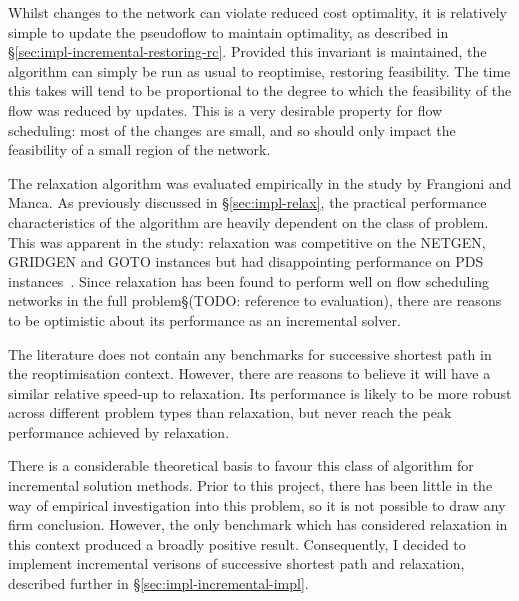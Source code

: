Whilst changes to the network can violate reduced cost optimality, it is relatively simple to update the pseudoflow to maintain optimality, as described in \S\ref{sec:impl-incremental-restoring-rc}. Provided this invariant is maintained, the algorithm can simply be run as usual to reoptimise, restoring feasibility. The time this takes will tend to be proportional to the degree to which the feasibility of the flow was reduced by updates\footnotemark. This is a very desirable property for flow scheduling: most of the changes are small, and so should only impact the feasibility of a small region of the network.

The relaxation algorithm was evaluated empirically in the study by Frangioni and Manca. As previously discussed in \S\ref{sec:impl-relax}, the practical performance characteristics of the algorithm are heavily dependent on the class of problem. This was apparent in the study: relaxation was competitive on the NETGEN, GRIDGEN and GOTO instances but had disappointing performance on PDS instances~\cite[tables~1~to~4]{Frangioni:2006}. Since relaxation has been found to perform well on flow scheduling networks in the full problem\S(TODO: reference to evaluation), there are reasons to be optimistic about its performance as an incremental solver.

The literature does not contain any benchmarks for successive shortest path in the reoptimisation context. However, there are reasons to believe it will have a similar relative speed-up to relaxation. Its performance is likely to be more robust across different problem types than relaxation, but never reach the peak performance achieved by relaxation.

There is a considerable theoretical basis to favour this class of algorithm for incremental solution methods. Prior to this project, there has been little in the way of empirical investigation into this problem, so it is not possible to draw any firm conclusion. However, the only benchmark which has considered relaxation in this context produced a broadly positive result. Consequently, I decided to implement incremental verisons of successive shortest path and relaxation, described further in \S\ref{sec:impl-incremental-impl}.

